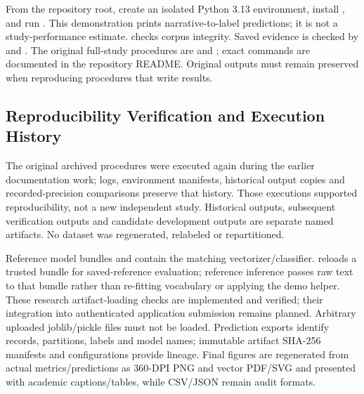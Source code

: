 From the repository root, create an isolated Python 3.13 environment, install , and run . This demonstration prints narrative-to-label predictions; it is not a study-performance estimate.  checks corpus integrity. Saved evidence is checked by  and . The original full-study procedures are  and ; exact commands are documented in the repository README. Original outputs must remain preserved when reproducing procedures that write results.

\subsection{Reproducibility Verification and Execution History}\label{sec:verification-history}
The original archived procedures were executed again during the earlier documentation work; logs, environment manifests, historical output copies and recorded-precision comparisons preserve that history. Those executions supported reproducibility, not a new independent study. Historical outputs, subsequent verification outputs and candidate development outputs are separate named artifacts. No dataset was regenerated, relabeled or repartitioned.

Reference model bundles  and  contain the matching vectorizer/classifier.  reloads a trusted bundle for saved-reference evaluation; reference inference passes raw text to that bundle rather than re-fitting vocabulary or applying the demo helper. These research artifact-loading checks are implemented and verified; their integration into authenticated application submission remains planned. Arbitrary uploaded joblib/pickle files must not be loaded. Prediction exports identify records, partitions, labels and model names; immutable artifact SHA-256 manifests and configurations provide lineage. Final figures are regenerated from actual metrics/predictions as 360-DPI PNG and vector PDF/SVG and presented with academic captions/tables, while CSV/JSON remain audit formats.



